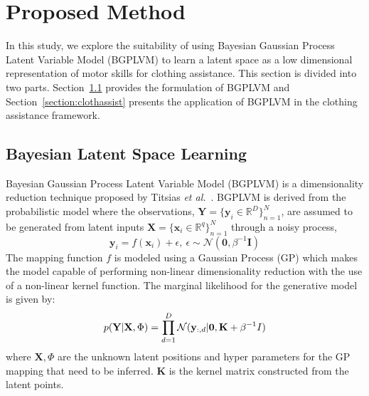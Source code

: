 \documentclass{article}
\begin{document}
\section{Proposed Method}
\label{section:method}

In this study, we explore the suitability of using Bayesian Gaussian Process Latent Variable Model (BGPLVM) to learn a latent space as a low dimensional representation of motor skills for clothing assistance. This section is divided into two parts. Section~\ref{section:bgplvm} provides the formulation of BGPLVM and Section~\ref{section:clothassist} presents the application of BGPLVM in the clothing assistance framework.

\subsection{Bayesian Latent Space Learning}
\label{section:bgplvm}

Bayesian Gaussian Process Latent Variable Model (BGPLVM) is a dimensionality reduction technique proposed by Titsias \emph{et al.}~\cite{bgplvm}. BGPLVM is derived from the probabilistic model where the observations, $\mathbf{Y} = \{\mathbf{y}_{i} \in \mathbb{R}^D\}_{n=1}^N$, are assumed to be generated from latent inputs $\mathbf{X} = \{\mathbf{x}_{i} \in \mathbb{R}^q\}_{n=1}^N$ through a noisy process,
\begin{equation}
  \mathbf{y}_i = f(\mathbf{x}_i) + \epsilon,~\epsilon \sim \mathcal{N}(\mathbf{0},\beta^{-1}\mathbf{I})
\end{equation}
The mapping function $f$ is modeled using a Gaussian Process (GP) which makes the model capable of performing non-linear dimensionality reduction with the use of a non-linear kernel function. The marginal likelihood for the generative model is given by:
\begin{equation}
  \label{eqn:marginallikelihood}
  p(\mathbf{Y}|\mathbf{X},\Phi) = \prod_{d=1}^{D} \mathcal{N}(\mathbf{y}_{:,d}|\mathbf{0},\mathbf{K}+\beta^{-1}I)\\
\end{equation}
where $\mathbf{X},\Phi$ are the unknown latent positions and hyper parameters for the GP mapping that need to be inferred. $\mathbf{K}$ is the kernel matrix constructed from the latent points.
\end{document}
